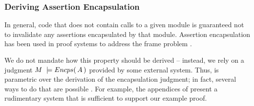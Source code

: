 %

\subsubsection{Deriving  Assertion Encapsulation}

{In general},  code that does not contain 
calls to a {given} module is guaranteed not to invalidate any assertions encapsulated by that module.
 Assertion encapsulation has been used in proof systems to {address}   the  {frame} problem
 \cite{objInvars,encaps}. 

We  do not mandate how this property should be derived -- instead, we rely on a judgment 
$M\ \models  \encaps{A}$ provided by some external system. 
Thus, \SpecLang is parametric over the derivation of the encapsulation
     judgment; in fact, several ways to do that are possible \cite{TAME2003,ownEncaps,objInvars}. For example,
 the appendices of
    \cite{necessityFull} present a 
    rudimentary system that is sufficient to support our example
    proof.  



